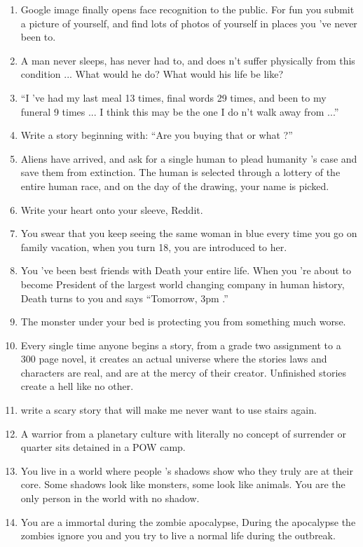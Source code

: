 \begin{enumerate}[noitemsep]
    \item Google image finally opens face recognition to the public. For fun you submit a picture of yourself, and find lots of photos of yourself in places you 've never been to.
    \item A man never sleeps, has never had to, and does n't suffer physically from this condition ... What would he do? What would his life be like?
    \item “I 've had my last meal 13 times, final words 29 times, and been to my funeral 9 times ... I think this may be the one I do n't walk away from ...”
    \item Write a story beginning with: “Are you buying that or what ?”
    \item Aliens have arrived, and ask for a single human to plead humanity 's case and save them from extinction. The human is selected through a lottery of the entire human race, and on the day of the drawing, your name is picked.
    \item Write your heart onto your sleeve, Reddit.
    \item You swear that you keep seeing the same woman in blue every time you go on family vacation, when you turn 18, you are introduced to her.
    \item You 've been best friends with Death your entire life. When you 're about to become President of the largest world changing company in human history, Death turns to you and says “Tomorrow, 3pm .”
    \item The monster under your bed is protecting you from something much worse.
    \item Every single time anyone begins a story, from a grade two assignment to a 300 page novel, it creates an actual universe where the stories laws and characters are real, and are at the mercy of their creator. Unfinished stories create a hell like no other.
    \item write a scary story that will make me never want to use stairs again.
    \item A warrior from a planetary culture with literally no concept of surrender or quarter sits detained in a POW camp.
    \item You live in a world where people 's shadows show who they truly are at their core. Some shadows look like monsters, some look like animals. You are the only person in the world with no shadow.
    \item You are a immortal during the zombie apocalypse, During the apocalypse the zombies ignore you and you try to live a normal life during the outbreak.

\end{enumerate}
